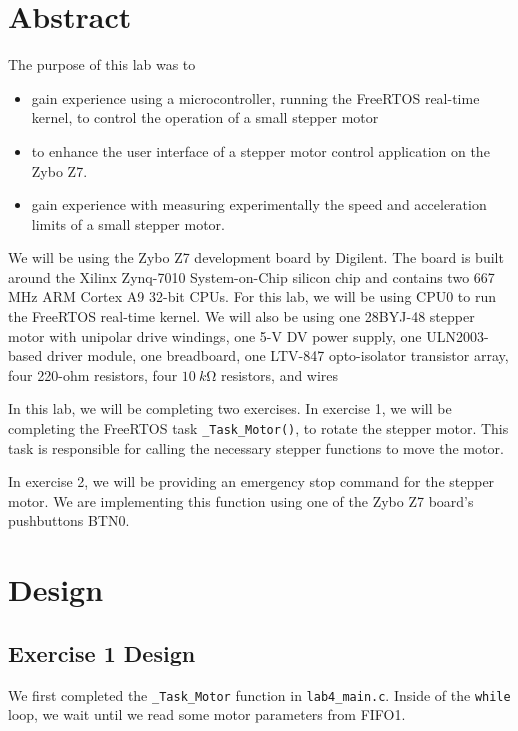 \documentclass[11pt, letterpaper, titlepage]{article}
\title{\textbf{\Huge{ 
\begin{center}
ECE 315 Lab 4%
\end{center} 
}}}
\author{Lora Ma \\ Benjamin Kong \\ \\ECE 315 Lab Section H41}
\begin{document}
\maketitle
\thispagestyle{empty}
\tableofcontents 
\newpage
{}

\section{Abstract}
The purpose of this lab was to 
\begin{itemize}
  \item gain experience using a microcontroller, running the FreeRTOS real-time kernel, to control the operation of a small stepper motor
  \item to enhance the user interface of a stepper motor control application on the Zybo Z7.
  \item gain experience with measuring experimentally the speed and acceleration limits of a small stepper motor.
\end{itemize}
We will be using the Zybo Z7 development board by Digilent. The board is built around the Xilinx Zynq-7010 System-on-Chip silicon chip and contains two 667 MHz ARM Cortex A9 32-bit CPUs. For this lab, we will be using CPU0 to run the FreeRTOS real-time kernel. We will also be using one 28BYJ-48 stepper motor with unipolar drive windings, one 5-V DV power supply, one ULN2003-based driver module, one breadboard, one LTV-847 opto-isolator transistor array, four 220-ohm resistors, four $\SI{10}{k\ohm}$ resistors, and wires

In this lab, we will be completing two exercises. In exercise 1, we will be completing the FreeRTOS task \texttt{_Task_Motor()}, to rotate the stepper motor. This task is responsible for calling the necessary stepper functions to move the motor.

In exercise 2, we will be providing an emergency stop command for the stepper motor. We are implementing this function using one of the Zybo Z7 board's pushbuttons BTN0.

\section{Design}

\subsection{Exercise 1 Design}
We first completed the \texttt{_Task_Motor} function in \texttt{lab4_main.c}. Inside of the \texttt{while} loop, we wait until we read some motor parameters from FIFO1.
\end{document}
